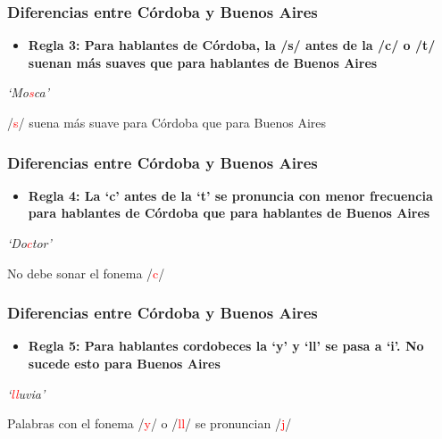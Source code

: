\documentclass[mathserif]{beamer}%
\begin{document}
\begin{frame}[noframenumbering]
 	\frametitle{Diferencias entre Córdoba y Buenos Aires}
 	\begin{itemize}\itemsep=3ex
		\item \textbf{Regla 3: Para hablantes de Córdoba, la /s/ antes de la /c/ o /t/ suenan más suaves que para hablantes de Buenos Aires} \\ 
	\end{itemize}
	 	
	\begin{center}
		\textit{`Mo\textcolor{red}{s}ca'}
	\end{center} 
	 	
	\begin{center}
			/\textcolor{red}{s}/ suena más suave para Córdoba que para Buenos Aires
	\end{center}
	\end{frame}

\begin{frame}[noframenumbering]
 	\frametitle{Diferencias entre Córdoba y Buenos Aires}
 	\begin{itemize}\itemsep=3ex
 		\item \textbf{Regla 4: La `c' antes de la `t' se pronuncia con menor frecuencia para hablantes de Córdoba que para hablantes de Buenos Aires} \\ 
	\end{itemize}
 	
 	\begin{center}
 		\textit{`Do\textcolor{red}{c}tor'}
 	\end{center} 
 	
 	\begin{center}
 		No debe sonar el fonema /\textcolor{red}{c}/
 	\end{center}
\end{frame}

\begin{frame}[noframenumbering]
	\frametitle{Diferencias entre Córdoba y Buenos Aires}
	\begin{itemize}\itemsep=3ex
		\item \textbf{Regla 5: Para hablantes cordobeces la `y’ y `ll’ se pasa a `i’. No sucede esto para Buenos Aires} \\ 
	\end{itemize}
		
	\begin{center}
		\textit{`\textcolor{red}{ll}uvia'}
	\end{center} 
		
	\begin{center}
		Palabras con el fonema /\textcolor{red}{y}/ o /\textcolor{red}{ll}/ se pronuncian /\textcolor{red}{j}/
	\end{center}
\end{frame}
 
\end{document}
